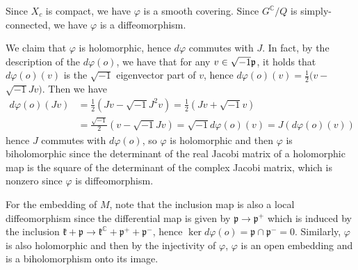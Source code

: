 Since $X_{c}$ is compact, we have $\varphi$ is a smooth covering.
Since $G^{\mathbb{C}} / Q$ is simply-connected, we have $\varphi$
is a diffeomorphism.

We claim that $\varphi$ is holomorphic, hence $d \varphi$
commutes with $J$. In fact, by the description of the $d\varphi(o)$, 
we have that for any $v \in \sqrt{-1}{\mathfrak p}$, it holds that $d \varphi(o)(v)$
is the $\sqrt{-1}$ eigenvector part of $v$, hence $d
\varphi(o)(v)=\frac{1}{2}(v-$ $\sqrt{-1} J v)$.
Then we have
\[
\begin{aligned}
	d \varphi(o)(J v) &=\frac{1}{2}\left(J v-\sqrt{-1} J^{2}
	v\right)=\frac{1}{2}(J v+\sqrt{-1} v) \\
	&=\frac{\sqrt{-1}}{2}(v-\sqrt{-1} J v)=\sqrt{-1} d
	\varphi(o)(v)=J(d \varphi(o)(v))
\end{aligned}
\]
hence $J$ commutes with $d \varphi(o)$, so $\varphi$ is
holomorphic and then $\varphi$ is biholomorphic since the
determinant of the real Jacobi matrix of a holomorphic
map is the square of the determinant of the complex Jacobi
matrix, which is
nonzero since $\varphi$ is diffeomorphism.

For the embedding of $M$, note that the inclusion map is also a
local diffeomorphism since the differential map is given by
$\mathfrak{p} \rightarrow \mathfrak{p}^{+}$ which is induced by
the inclusion $\mathfrak{k}+\mathfrak{p} \rightarrow
\mathfrak{k}^{\mathbb{C}}+\mathfrak{p}^{+}+\mathfrak{p}^{-}$,
hence $\operatorname{ker} d \varphi(o)=\mathfrak{p} \cap
\mathfrak{p}^{-}=0 .$ Similarly, $\varphi$ is also holomorphic
and then by the injectivity of $\varphi$, $\varphi$ is an open
embedding and is a biholomorphism onto its image.
\eproof


